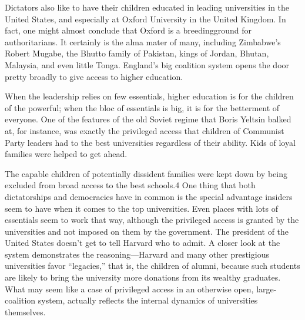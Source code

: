 \documentclass[10pt]{article}
\begin{document}
{\large Dictators also like to have their children educated in leading
universities in the United States, and especially at Oxford University in the
United Kingdom. In fact, one might almost conclude that Oxford is a
breedingground for authoritarians. It certainly is the alma mater of many,
including Zimbabwe's Robert Mugabe, the Bhutto family of Pakistan, kings of
Jordan, Bhutan, Malaysia, and even little Tonga. England's big coalition system
opens the door pretty broadly to give access to higher education.}

{\large When the leadership relies on few essentials, higher education is for
the children of the powerful; when the bloc of essentials is big, it is for the
betterment of everyone. One of the features of the old Soviet regime that Boris
Yeltsin balked at, for instance, was exactly the privileged access that children
of Communist Party leaders had to the best universities regardless of their
ability. Kids of loyal families were helped to get ahead.}

{\large The capable children of potentially dissident families were kept down by
being excluded from broad access to the best schools.4 One thing that both
dictatorships and democracies have in common is the special advantage insiders
seem to have when it comes to the top universities. Even places with lots of
essentials seem to work that way, although the privileged access is granted by
the universities and not imposed on them by the government. The president of the
United States doesn't get to tell Harvard who to admit. A closer look at the
system demonstrates the reasoning---Harvard and many other prestigious
universities favor ``legacies,'' that is, the children of alumni, because such
students are likely to bring the university more donations from its wealthy
graduates. What may seem like a case of privileged access in an otherwise open,
large-coalition system, actually reflects the internal dynamics of universities
themselves.}
\end{document}
